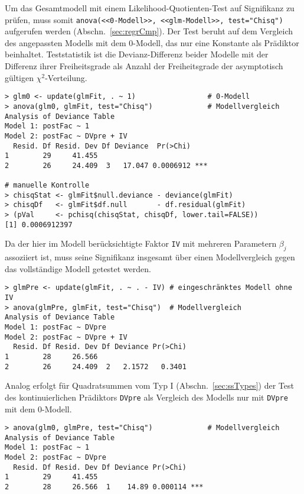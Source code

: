 Um das Gesamtmodell mit einem Likelihood-Quotienten-Test auf Signifikanz zu prüfen, muss somit \lstinline!anova(<<0-Modell>>, <<glm-Modell>>, test="Chisq")! aufgerufen werden (Abschn.\ \ref{sec:regrCmp}). Der Test beruht auf dem Vergleich des angepassten Modells mit dem $0$-Modell, das nur eine Konstante als Prädiktor beinhaltet. Teststatistik ist die Devianz-Differenz beider Modelle mit der Differenz ihrer Freiheitsgrade als Anzahl der Freiheitsgrade der asymptotisch gültigen $\chi^{2}$-Verteilung.
\begin{lstlisting}
> glm0 <- update(glmFit, . ~ 1)                 # 0-Modell
> anova(glm0, glmFit, test="Chisq")             # Modellvergleich
Analysis of Deviance Table
Model 1: postFac ~ 1
Model 2: postFac ~ DVpre + IV
  Resid. Df Resid. Dev Df Deviance  Pr(>Chi)
1        29     41.455
2        26     24.409  3   17.047 0.0006912 ***

# manuelle Kontrolle
> chisqStat <- glmFit$null.deviance - deviance(glmFit)
> chisqDf   <- glmFit$df.null       - df.residual(glmFit)
> (pVal     <- pchisq(chisqStat, chisqDf, lower.tail=FALSE))
[1] 0.0006912397
\end{lstlisting}

Da der hier im Modell berücksichtigte Faktor \lstinline!IV! mit mehreren Parametern $\beta_{j}$ assoziiert ist, muss seine Signifikanz insgesamt über einen Modellvergleich gegen das vollständige Modell getestet werden.
\begin{lstlisting}
> glmPre <- update(glmFit, . ~ . - IV) # eingeschränktes Modell ohne IV
> anova(glmPre, glmFit, test="Chisq")  # Modellvergleich
Analysis of Deviance Table
Model 1: postFac ~ DVpre
Model 2: postFac ~ DVpre + IV
  Resid. Df Resid. Dev Df Deviance Pr(>Chi)
1        28     26.566
2        26     24.409  2   2.1572   0.3401
\end{lstlisting}

Analog erfolgt für Quadratsummen vom Typ I (Abschn.\ \ref{sec:ssTypes}) der Test des kontinuierlichen Prädiktors \lstinline!DVpre! als Vergleich des Modells nur mit \lstinline!DVpre! mit dem $0$-Modell.
\begin{lstlisting}
> anova(glm0, glmPre, test="Chisq")             # Modellvergleich
Analysis of Deviance Table
Model 1: postFac ~ 1
Model 2: postFac ~ DVpre
  Resid. Df Resid. Dev Df Deviance Pr(>Chi)
1        29     41.455
2        28     26.566  1    14.89 0.000114 ***
\end{lstlisting}

